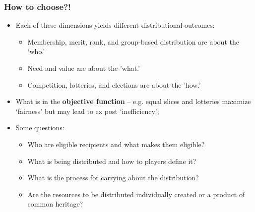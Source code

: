 \documentclass[aspectratio=169]{beamer}
\theoremstyle{principle}
\begin{document}
\begin{frame}
\frametitle{How to choose?!}

\begin{itemize}
\item Each of these dimensions yields different distributional outcomes:
\begin{itemize}
\item Membership, merit, rank, and group-based distribution are about the `who.'
\item Need and value are about the 'what.'
\item Competition, lotteries, and elections are about the 'how.'
\end{itemize}
\bigskip
\bigskip
\item What is in the \textbf{objective function} -- e.g. equal slices and lotteries maximize `fairness' but may lead to ex post `inefficiency';
\bigskip
\bigskip
\item Some questions:
\begin{itemize}
\item Who are eligible recipients and what makes them eligible?
\item What is being distributed and how to players define it?
\item What is the process for carrying about the distribution?
\item Are the resources to be distributed individually created or a product of common heritage?
\end{itemize}
\end{itemize}

\end{frame}
\end{document}

